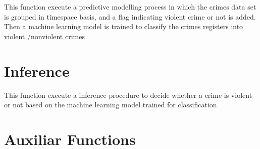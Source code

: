 \documentclass[letterpaper,10pt,english]{sphinxmanual}
\begin{document}
\begin{fulllineitems}
\label{\detokenize{index:dummy_project_predictive_modeling.main}}
\sphinxAtStartPar
{}

\sphinxAtStartPar
This function execute a predictive modelling process in which the crimes data set is grouped in time\sphinxhyphen{}space
basis, and a flag indicating violent crime or not is added. Then a machine learning model is trained to classify
the crimes registers into violent /non\sphinxhyphen{}violent crimes

\end{fulllineitems}



\chapter{Inference}
\label{\detokenize{index:module-dummy_project_inference}}\label{\detokenize{index:inference}}

\begin{fulllineitems}
\label{\detokenize{index:dummy_project_inference.main}}
\sphinxAtStartPar
{}

\sphinxAtStartPar
This function execute a inference procedure to decide whether a crime is violent or not based on the machine learning
model trained for classification

\end{fulllineitems}



\chapter{Auxiliar Functions}
\label{\detokenize{index:module-dummy_project_utils}}\label{\detokenize{index:auxiliar-functions}}\label{\detokenize{index:module-utils}}
\end{document}
